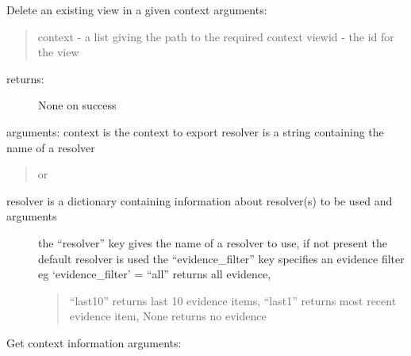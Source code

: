 \documentclass[letterpaper,10pt,english]{sphinxmanual}
\begin{document}
\begin{fulllineitems}

\begin{fulllineitems}
\label{personis.client:personis.client.Access.delview}
Delete an existing view in a given context
arguments:
\begin{quote}

context - a list giving the path to the required context
viewid - the id for the view
\end{quote}
\begin{description}
\item[{returns:}] \leavevmode
None on success

\end{description}

\end{fulllineitems}


\begin{fulllineitems}
\label{personis.client:personis.client.Access.export_model}
arguments:
context is the context to export
resolver is a string containing the name of a resolver
\begin{quote}

or
\end{quote}
\begin{description}
\item[{resolver is a dictionary containing information about resolver(s) to be used and arguments}] \leavevmode
the ``resolver'' key gives the name of a resolver to use, if not present the default resolver is used
the ``evidence\_filter'' key specifies an evidence filter
eg `evidence\_filter' =  ``all'' returns all evidence,
\begin{quote}

``last10'' returns last 10 evidence items,
``last1'' returns most recent evidence item,
None returns no evidence
\end{quote}

\end{description}

\end{fulllineitems}


\begin{fulllineitems}
\label{personis.client:personis.client.Access.getcontext}
Get context information
arguments:
\begin{quote}


\end{quote}
\end{fulllineitems}
\end{fulllineitems}
\end{document}
